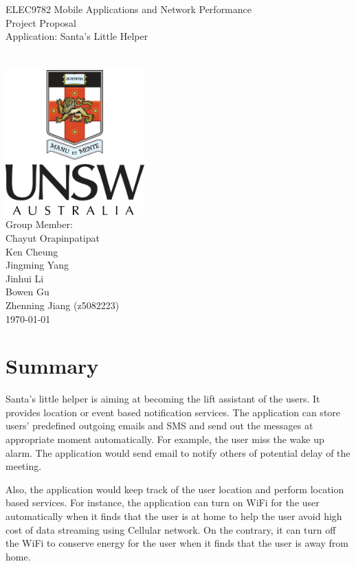 \documentclass[a4paper,12pt]{article}
\author{Zhenning Jiang (z5082223)}
\date{\today}
\begin{document}
	\begin{titlepage}
		\begin{center}
			\Huge{
				ELEC9782 Mobile Applications and Network Performance\\
			}
			\Huge{
				Project Proposal\\
				[1cm]
				Application: Santa's Little Helper\\
			}
			\\
			[2cm]\\
			
			\includegraphics[width = 0.4\textwidth]{UNSW_coat_of_arms.png}\\
			[1.5cm]
			\Large{Group Member: \\
				Chayut Orapinpatipat\\
				Ken Cheung \\
				Jingming Yang\\
				Jinhui Li\\
				Bowen Gu\\
				Zhenning Jiang (z5082223)\\
				[0.7cm]
				\today\\
				[0.7cm]
			}		
		\end{center}
	\end{titlepage}
    \newpage
	
	\section{Summary}
	Santa's little helper is aiming at becoming the lift assistant of the users. It provides location or event based notification services. The application can store users' predefined outgoing emails and SMS and send out the messages at appropriate moment automatically. For example, the user miss the wake up alarm. The application would send email to notify others of potential delay of the meeting. 
	
	Also, the application would keep track of the user location and perform location based services. For instance, the application can turn on WiFi for the user automatically when it finds that the user is at home to help the user avoid high cost of data streaming using Cellular network. On the contrary, it can turn off the WiFi to conserve energy for the user when it finds that the user is away from home. 
	
\end{document}
